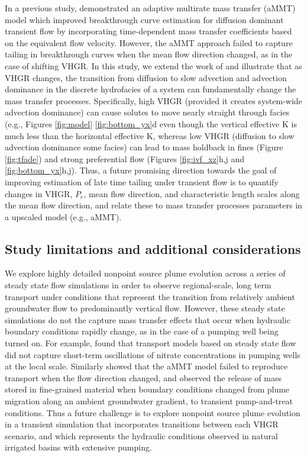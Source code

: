 In a previous study, \citet{guo2020adaptive} demonstrated an adaptive multirate mass transfer (aMMT) model which improved breakthrough curve estimation for diffusion dominant transient flow by incorporating time-dependent mass transfer coefficients based on the equivalent flow velocity. However, the aMMT approach failed to capture tailing in breakthrough curves when the mean flow direction changed, as in the case of shifting VHGR. In this study, we extend the work of \citet{guo2020adaptive} and illustrate that as VHGR changes, the transition from diffusion to slow advection and advection dominance in the discrete hydrofacies of a system can fundamentally change the mass transfer processes. Specifically, high VHGR (provided it creates system-wide advection dominance) can cause solutes to move nearly straight through facies (e.g., Figures \ref{fig:model} \ref{fig:bottom_yx}d even though the vertical effective K is much less than the horizontal effective K, whereas low VHGR (diffusion to slow advection dominance some facies) can lead to mass holdback in fines (Figure \ref{fig:tfade}) and strong preferential flow (Figures \ref{fig:ivf_xz}h,j and \ref{fig:bottom_yx}h,j). Thus, a future promising direction towards the goal of improving estimation of late time tailing under transient flow is to quantify changes in VHGR, $P_e$, mean flow direction, and characteristic length scales along the mean flow direction, and relate these to mass transfer processes parameters in a upscaled model (e.g., aMMT).




%
%
\subsection{Study limitations and additional considerations}
\label{ss_limitations}

We explore highly detailed nonpoint source plume evolution across a series of steady state flow simulations in order to observe regional-scale, long term transport under conditions that represent the transition from relatively ambient groundwater flow to predominantly vertical flow. However, these steady state simulations do not the capture mass transfer effects that occur when hydraulic boundary conditions rapidly change, as in the case of a pumping well being turned on. For example, \citet{bastani2020effects} found that transport models based on steady state flow did not capture short-term oscillations of nitrate concentrations in pumping wells at the local scale. Similarly \citet{guo2020adaptive} showed that the aMMT model failed to reproduce transport when the flow direction changed, and \citep{labolle2001role} observed the release of mass stored in fine-grained material when boundary conditions changed from plume migration along an ambient groundwater gradient, to transient pump-and-treat conditions. Thus a future challenge is to explore nonpoint source plume evolution in a transient simulation that incorporates transitions between each VHGR scenario, and which represents the hydraulic conditions observed in natural irrigated basins with extensive pumping. 

